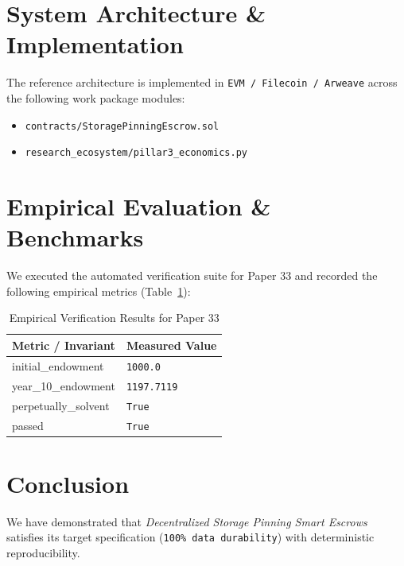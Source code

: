\documentclass[10pt,twocolumn]{article}
\begin{document}
\section{System Architecture \& Implementation}
The reference architecture is implemented in \texttt{EVM / Filecoin / Arweave} across the following work package modules:
\begin{itemize}
  \item \texttt{contracts/StoragePinningEscrow.sol}
  \item \texttt{research\_ecosystem/pillar3\_economics.py}
\end{itemize}

\section{Empirical Evaluation \& Benchmarks}
We executed the automated verification suite for Paper 33 and recorded the following empirical metrics (Table~\ref{tab:metrics}):

\begin{table}[htbp]
\centering
\caption{Empirical Verification Results for Paper 33}
\label{tab:metrics}
\begin{tabular}{ll}
\toprule
\textbf{Metric / Invariant} & \textbf{Measured Value} \\
\midrule
    initial\_endowment & \texttt{1000.0} \\
    year\_10\_endowment & \texttt{1197.7119} \\
    perpetually\_solvent & \texttt{True} \\
    passed & \texttt{True} \\
\bottomrule
\end{tabular}
\end{table}

\section{Conclusion}
We have demonstrated that \textit{Decentralized Storage Pinning Smart Escrows} satisfies its target specification (\texttt{100\% data durability}) with deterministic reproducibility.



\end{document}
